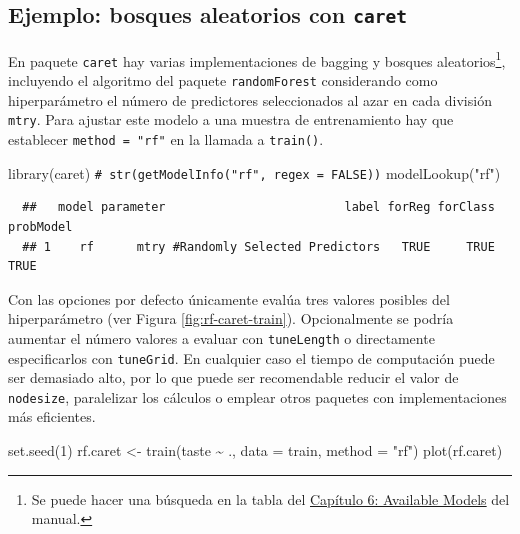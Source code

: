 \documentclass[
]{book}
\newenvironment{Shaded}{\begin{snugshade}}{\end{snugshade}}
\newcommand{\AttributeTok}[1]{\textcolor[rgb]{0.77,0.63,0.00}{#1}}
\newcommand{\CommentTok}[1]{\textcolor[rgb]{0.56,0.35,0.01}{\textit{#1}}}
\newcommand{\DecValTok}[1]{\textcolor[rgb]{0.00,0.00,0.81}{#1}}
\newcommand{\FunctionTok}[1]{\textcolor[rgb]{0.00,0.00,0.00}{#1}}
\newcommand{\NormalTok}[1]{#1}
\newcommand{\OtherTok}[1]{\textcolor[rgb]{0.56,0.35,0.01}{#1}}
\newcommand{\SpecialCharTok}[1]{\textcolor[rgb]{0.00,0.00,0.00}{#1}}
\newcommand{\StringTok}[1]{\textcolor[rgb]{0.31,0.60,0.02}{#1}}
\theoremstyle{break}
\theoremstyle{nonumberplain}
\renewcommand{\CommentTok}[1]{\textcolor[rgb]{0.41,0.41,0.41}{\texttt{#1}}}
\begin{document}
\hypertarget{ejemplo-bosques-aleatorios-con-caret}{%
\subsection{\texorpdfstring{Ejemplo: bosques aleatorios con \texttt{caret}}{Ejemplo: bosques aleatorios con caret}}\label{ejemplo-bosques-aleatorios-con-caret}}

En paquete \texttt{caret} hay varias implementaciones de bagging y bosques aleatorios\footnote{Se puede hacer una búsqueda en la tabla del \href{https://topepo.github.io/caret/available-models.html}{Capítulo 6: Available Models} del manual.}, incluyendo el algoritmo del paquete \texttt{randomForest} considerando como hiperparámetro el número de predictores seleccionados al azar en cada división \texttt{mtry}.
Para ajustar este modelo a una muestra de entrenamiento hay que establecer \texttt{method\ =\ "rf"} en la llamada a \texttt{train()}.

\begin{Shaded}
\begin{Highlighting}[]
\FunctionTok{library}\NormalTok{(caret)}
\CommentTok{\# str(getModelInfo("rf", regex = FALSE))}
\FunctionTok{modelLookup}\NormalTok{(}\StringTok{"rf"}\NormalTok{)}
\end{Highlighting}
\end{Shaded}

\begin{verbatim}
  ##   model parameter                         label forReg forClass probModel
  ## 1    rf      mtry #Randomly Selected Predictors   TRUE     TRUE      TRUE
\end{verbatim}

Con las opciones por defecto únicamente evalúa tres valores posibles del hiperparámetro (ver Figura \ref{fig:rf-caret-train}).
Opcionalmente se podría aumentar el número valores a evaluar con \texttt{tuneLength} o directamente especificarlos con \texttt{tuneGrid}.
En cualquier caso el tiempo de computación puede ser demasiado alto, por lo que puede ser recomendable reducir el valor de \texttt{nodesize}, paralelizar los cálculos o emplear otros paquetes con implementaciones más eficientes.

\begin{Shaded}
\begin{Highlighting}[]
\FunctionTok{set.seed}\NormalTok{(}\DecValTok{1}\NormalTok{)}
\NormalTok{rf.caret }\OtherTok{\textless{}{-}} \FunctionTok{train}\NormalTok{(taste }\SpecialCharTok{\textasciitilde{}}\NormalTok{ ., }\AttributeTok{data =}\NormalTok{ train, }\AttributeTok{method =} \StringTok{"rf"}\NormalTok{)}
\FunctionTok{plot}\NormalTok{(rf.caret)}
\end{Highlighting}
\end{Shaded}
\end{document}
